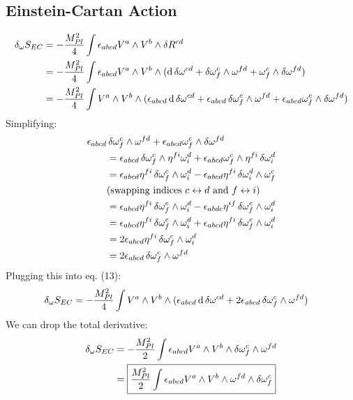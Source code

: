 \documentclass[12pt]{article}
\begin{document}
\subsection{Einstein-Cartan Action}
\begin{align}
  \var_\omega{S_{EC}} &= -\frac{M_{Pl}^2}{4} \int \epsilon_{abcd}V^a \wedge V^b \wedge \var{R^{cd}} \nonumber \\
  &= -\frac{M_{Pl}^2}{4} \int \epsilon_{abcd}V^a \wedge V^b \wedge (\dd{\var{\omega^{cd}}} + \var{\omega^c_f} \wedge \omega^{fd} + \omega^c_f \wedge \var{\omega^{fd}}) \nonumber \\
  &= -\frac{M_{Pl}^2}{4} \int V^a \wedge V^b \wedge (\epsilon_{abcd}\dd{\var{\omega^{cd}}} + \epsilon_{abcd}\var{\omega^c_f} \wedge \omega^{fd} + \epsilon_{abcd}\omega^c_f \wedge \var{\omega^{fd}})
\end{align}
Simplifying:
\begin{align*}
  \epsilon_{abcd}&\var{\omega^c_f} \wedge \omega^{fd} + \epsilon_{abcd}\omega^c_f \wedge \var{\omega^{fd}} \\
  &= \epsilon_{abcd}\var{\omega^c_f} \wedge \eta^{fi}\omega^d_i + \epsilon_{abcd}\omega^c_f \wedge \eta^{fi}\var{\omega^d_i} \\
  &= \epsilon_{abcd}\eta^{fi} \var{\omega^c_f} \wedge \omega^d_i - \epsilon_{abcd}\eta^{fi} \var{\omega^d_i} \wedge \omega^c_f \\
  &\text{(swapping indices $c \leftrightarrow d$ and $f \leftrightarrow i$)} \\
  &= \epsilon_{abcd}\eta^{fi} \var{\omega^c_f} \wedge \omega^d_i - \epsilon_{abdc}\eta^{if} \var{\omega^c_f} \wedge \omega^d_i \\
  &= \epsilon_{abcd}\eta^{fi} \var{\omega^c_f} \wedge \omega^d_i + \epsilon_{abcd}\eta^{fi} \var{\omega^c_f} \wedge \omega^d_i \\
  &= 2\epsilon_{abcd}\eta^{fi} \var{\omega^c_f} \wedge \omega^d_i \\
  &= 2\epsilon_{abcd} \var{\omega^c_f} \wedge \omega^{fd}
\end{align*}
Plugging this into eq. (13):
\begin{align*}
  \var_\omega{S_{EC}} &= -\frac{M_{Pl}^2}{4} \int V^a \wedge V^b \wedge (\epsilon_{abcd}\dd{\var{\omega^{cd}}} + 2\epsilon_{abcd} \var{\omega^c_f} \wedge \omega^{fd})
\end{align*}
We can drop the total derivative:
\begin{align}
  \var_\omega{S_{EC}} &= -\frac{M_{Pl}^2}{2} \int \epsilon_{abcd} V^a \wedge V^b \wedge \var{\omega^c_f} \wedge \omega^{fd} \nonumber \\
  &= \boxed{\frac{M_{Pl}^2}{2} \int \epsilon_{abcd} V^a \wedge V^b \wedge \omega^{fd} \wedge \var{\omega^c_f}}
\end{align}
\end{document}
